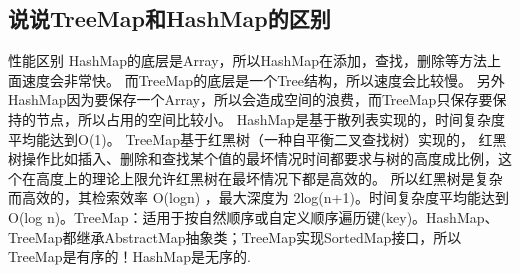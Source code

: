 \documentclass[../../../interview-questions.tex]{subfiles}
\begin{document}
\subsection{说说TreeMap和HashMap的区别}

性能区别 HashMap的底层是Array，所以HashMap在添加，查找，删除等方法上面速度会非常快。 而TreeMap的底层是一个Tree结构，所以速度会比较慢。 另外HashMap因为要保存一个Array，所以会造成空间的浪费，而TreeMap只保存要保持的节点，所以占用的空间比较小。
HashMap是基于散列表实现的，时间复杂度平均能达到O(1)。 TreeMap基于红黑树（一种自平衡二叉查找树）实现的， 红黑树操作比如插入、删除和查找某个值的最坏情况时间都要求与树的高度成比例，这个在高度上的理论上限允许红黑树在最坏情况下都是高效的。 所以红黑树是复杂而高效的，其检索效率 O(logn) ，最大深度为 2log(n+1)。时间复杂度平均能达到O(log n)。TreeMap：适用于按自然顺序或自定义顺序遍历键(key)。HashMap、TreeMap都继承AbstractMap抽象类；TreeMap实现SortedMap接口，所以TreeMap是有序的！HashMap是无序的.
\end{document}
